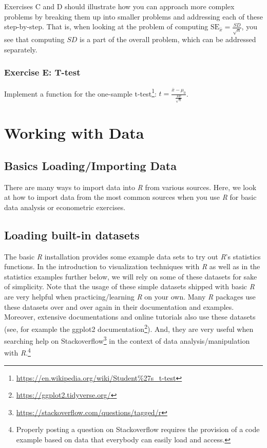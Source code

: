 \documentclass[
  12pt,
]{style/krantz}
\renewcommand{\href}[2]{#2\footnote{\url{#1}}}
\begin{document}
Exercises C and D should illustrate how you can approach more complex problems by breaking them up into smaller problems and addressing each of these step-by-step. That is, when looking at the problem of computing \(\text{SE}_{\bar{x}} = \frac{SD}{\sqrt{n}}\), you see that computing \(SD\) is a part of the overall problem, which can be addressed separately.

\hypertarget{exercise-e-t-test}{%
\subsection{Exercise E: T-test}\label{exercise-e-t-test}}

Implement a function for the one-sample \href{https://en.wikipedia.org/wiki/Student\%27s_t-test}{t-test}:
\(t = \frac{\bar{x} - \mu_0}{\frac{SE}{\sqrt{n}}}\).

\hypertarget{working-with-data}{%
\chapter{Working with Data}\label{working-with-data}}

\hypertarget{basics-loadingimporting-data}{%
\section{Basics Loading/Importing Data}\label{basics-loadingimporting-data}}

There are many ways to import data into \emph{R} from various sources. Here, we look at how to import data from the most common sources when you use \emph{R} for basic data analysis or econometric exercises.

\hypertarget{loading-built-in-datasets}{%
\section{Loading built-in datasets}\label{loading-built-in-datasets}}

The basic \emph{R} installation provides some example data sets to try out \emph{R}'s statistics functions. In the introduction to visualization techniques with \emph{R} as well as in the statistics examples further below, we will rely on some of these datasets for sake of simplicity. Note that the usage of these simple datasets shipped with basic \emph{R} are very helpful when practicing/learning \emph{R} on your own. Many \emph{R} packages use these datasets over and over again in their documentation and examples. Moreover, extensive documentations and online tutorials also use these datasets (see, for example the \href{https://ggplot2.tidyverse.org/}{ggplot2 documentation}). And, they are very useful when searching help on \href{https://stackoverflow.com/questions/tagged/r}{Stackoverflow} in the context of data analysis/manipulation with \emph{R}.\footnote{Properly posting a question on Stackoverflow requires the provision of a code example based on data that everybody can easily load and access.}
\end{document}

